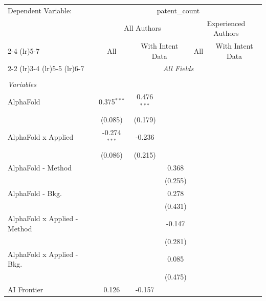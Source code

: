 \begingroup
\centering
\begin{tabular}{lcccccc}
   \tabularnewline \midrule \midrule
   Dependent Variable: & \multicolumn{6}{c}{patent\_count}\\
 & \multicolumn{3}{c}{All Authors} & \multicolumn{3}{c}{Experienced Authors} \\
\cmidrule(lr){2-4} \cmidrule(lr){5-7}
 & \multicolumn{1}{c}{All} & \multicolumn{2}{c}{With Intent Data} & \multicolumn{1}{c}{All} & \multicolumn{2}{c}{With Intent Data} \\
\cmidrule(lr){2-2} \cmidrule(lr){3-4} \cmidrule(lr){5-5} \cmidrule(lr){6-7}
 & \multicolumn{6}{c}{\textit{All Fields}} \\ \\
   \emph{Variables}\\
   AlphaFold                      & 0.375$^{***}$  & 0.476$^{***}$ &             &       &       &   \\   
                                  & (0.085)        & (0.179)       &             &       &       &   \\   
   AlphaFold x Applied            & -0.274$^{***}$ & -0.236        &             &       &       &   \\   
                                  & (0.086)        & (0.215)       &             &       &       &   \\   
   AlphaFold - Method             &                &               & 0.368       &       &       &   \\   
                                  &                &               & (0.255)     &       &       &   \\   
   AlphaFold - Bkg.               &                &               & 0.278       &       &       &   \\   
                                  &                &               & (0.431)     &       &       &   \\   
   AlphaFold x Applied - Method   &                &               & -0.147      &       &       &   \\   
                                  &                &               & (0.281)     &       &       &   \\   
   AlphaFold x Applied - Bkg.     &                &               & 0.085       &       &       &   \\   
                                  &                &               & (0.475)     &       &       &   \\   
   AI Frontier                    & 0.126          & -0.157        &             &       &       &   \\   

\end{tabular}

